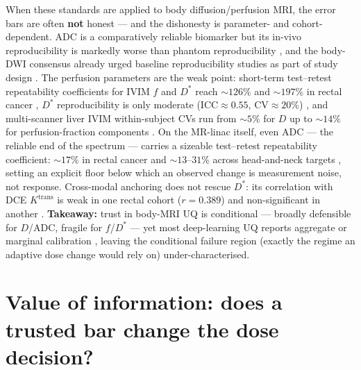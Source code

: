 \documentclass[review,number]{elsarticle}
\newcommand{\Dstar}{D^{*}}
\newcommand{\Ktrans}{K^{\mathrm{trans}}}
\begin{document}
When these standards are applied to body diffusion/perfusion MRI, the error bars are
often \textbf{not} honest --- and the dishonesty is parameter- and cohort-dependent. ADC
is a comparatively reliable biomarker but its in-vivo reproducibility is markedly worse
than phantom reproducibility \cite{miquel2016}, and the body-DWI consensus already urged
baseline reproducibility studies as part of study design \cite{koh2007,padhani2009}. The
perfusion parameters are the weak point: short-term test--retest repeatability
coefficients for IVIM $f$ and $\Dstar$ reach ${\sim}126\%$ and ${\sim}197\%$ in rectal
cancer \cite{sun2017}, $\Dstar$ reproducibility is only moderate
($\mathrm{ICC}\approx0.55$, $\mathrm{CV}\approx20\%$) \cite{yang2019}, and multi-scanner
liver IVIM within-subject CVs run from ${\sim}5\%$ for $D$ up to ${\sim}14\%$ for
perfusion-fraction components \cite{simchick2024}. On the MR-linac itself, even
ADC --- the reliable end of the spectrum --- carries a sizeable test--retest repeatability
coefficient: ${\sim}17\%$ in rectal cancer \cite{eijkelenkamp2025} and
${\sim}13$--$31\%$ across head-and-neck targets \cite{habrich2022}, setting an explicit
floor below which an observed change is measurement noise, not response. Cross-modal
anchoring does not rescue $\Dstar$: its correlation with DCE $\Ktrans$ is weak in one rectal cohort ($r=0.389$)
\cite{sun2019} and non-significant in another \cite{yang2019}. \textbf{Takeaway:} trust
in body-MRI UQ is conditional --- broadly defensible for $D$/ADC, fragile for
$f$/$\Dstar$ --- yet most deep-learning UQ reports aggregate or marginal calibration
\cite{casali2025}, leaving the conditional failure region (exactly the regime an adaptive
dose change would rely on) under-characterised.

\section{Value of information: does a trusted bar change the dose decision?}
\label{sec:voi}
\end{document}
